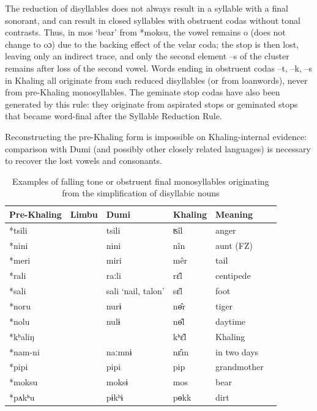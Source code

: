 \documentclass[oldfontcommands,oneside,a4paper,11pt]{article}
\newcommand{\ipa}[1]{{\phon \mbox{#1}}} %
\begin{document}
The reduction of disyllables does not always result in a syllable with a final sonorant, and can result in closed syllables with obstruent codas without tonal contrasts. Thus, in  \ipa{mos}	`bear' from \ipa{*moksu}, the vowel remains \ipa{o} (does not change to \ipa{oɔ}) due to the backing effect of the velar coda; the stop is then lost, leaving only an indirect trace, and only the second element \ipa{--s} of the cluster remains after loss of the second vowel. Words ending in obstruent codas \ipa{--t}, \ipa{--k}, \ipa{--s}   in Khaling all originate from such reduced disyllables (or from loanwords), never from pre-Khaling monosyllables. The geminate stop codas have also been generated by this rule: they originate from aspirated stops or geminated stops that  became word-final after the Syllable Reduction Rule.

Reconstructing the pre-Khaling form is impossible on Khaling-internal evidence: comparison with Dumi (and possibly other closely related languages) is necessary to recover the lost vowels and consonants.

\begin{table}[h]
\caption{Examples of falling tone or obstruent final  monosyllables originating from the simplification of   disyllabic nouns } \centering \label{tab:falling.reduction}
\begin{tabular}{llllll}
\toprule
Pre-Khaling	&Limbu	&Dumi	&Khaling	&Meaning\\
\midrule
\ipa{*tsili}			&&	\ipa{tsili}	&	\ipa{ʦîl}	&	anger\\
\ipa{*nini	}		&&	\ipa{nini}	&	\ipa{nîn}		&aunt (FZ)\\
\ipa{*meri}		&&		\ipa{miri}	&	\ipa{mêr}	&	tail\\
\ipa{*rali	}		&&	\ipa{raːli}	&	\ipa{rɛ̂l}		&centipede \\
\ipa{*sali	}		&&	\ipa{sali} `nail, talon'	&	\ipa{sɛ̂l}		&foot \\
\midrule
\ipa{*noru	}		&&	\ipa{nurɨ}	&	\ipa{nɵ̂r}		& tiger \\
\ipa{*nolu	}		&&	\ipa{nulɨ}	&	\ipa{nɵ̂l}		& daytime \\
\midrule
\ipa{*kʰaliŋ}				&&&	\ipa{kʰɛ‍̂l}	&	Khaling\\
\ipa{*nam-ni}	&&		\ipa{naːmnɨ	}&	\ipa{nɛ̂m}	&	in two days\\
\midrule
\ipa{*pipi} 	&   & \ipa{pipi}	&	\ipa{pip}		& grandmother \\
\ipa{*moksu} 	&   & \ipa{moksɨ}	&	\ipa{mos}		&bear \\
\ipa{*pʌkʰu} 	&   & \ipa{pɨkʰɨ}	&	\ipa{pɵkk}		& dirt \\
\bottomrule
\end{tabular}
\end{table}
\end{document}
